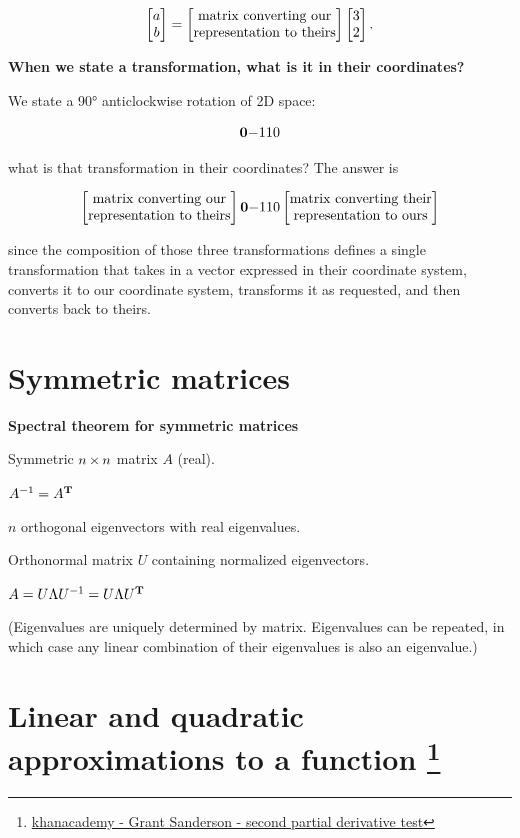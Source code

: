 \documentclass[12pt]{article}
\begin{document}
$$
\begin{bmatrix}a\\b\end{bmatrix} =
\begin{bmatrix}\text{matrix converting our}\\\text{representation to theirs} \\ \end{bmatrix}
\begin{bmatrix}3\\2\end{bmatrix}.
$$

\textbf{When we state a transformation, what is it in their coordinates?}

We state a 90° anticlockwise rotation of 2D space:

$$
\mathbf{0}{-1}
    {1}{0}
$$

what is that transformation in their coordinates? The answer is

$$
\begin{bmatrix}\text{matrix converting our}\\\text{representation to theirs} \\ \end{bmatrix}
\mathbf{0}{-1}
    {1}{0}
\begin{bmatrix}\text{matrix converting their}\\\text{representation to ours} \\ \end{bmatrix}
$$

since the composition of those three transformations defines a single
transformation that takes in a vector expressed in their coordinate system,
converts it to our coordinate system, transforms it as requested, and then
converts back to theirs.


\section{Symmetric matrices}

\textbf{Spectral theorem for symmetric matrices}

Symmetric $n \operatorname{\times} n$ matrix $A$ (real).

$A^{-1} = A^{\mathbf{T}}$

$n$ orthogonal eigenvectors with real eigenvalues.

Orthonormal matrix $U$ containing normalized eigenvectors.

$A = U\Lambda U^{-1} = U\Lambda U^{\mathbf{T}}$

(Eigenvalues are uniquely determined by matrix. Eigenvalues can be repeated, in which case any linear combination of their
eigenvalues is also an eigenvalue.)



\section*{Linear and quadratic approximations to a function
  \footnote{
    \href{https://www.khanacademy.org/math/multivariable-calculus/applications-of-multivariable-derivatives/optimizing-multivariable-functions/a/reasoning-behind-the-second-partial-derivative-test}{khanacademy - Grant Sanderson - second partial derivative test}
  }
}
\end{document}
